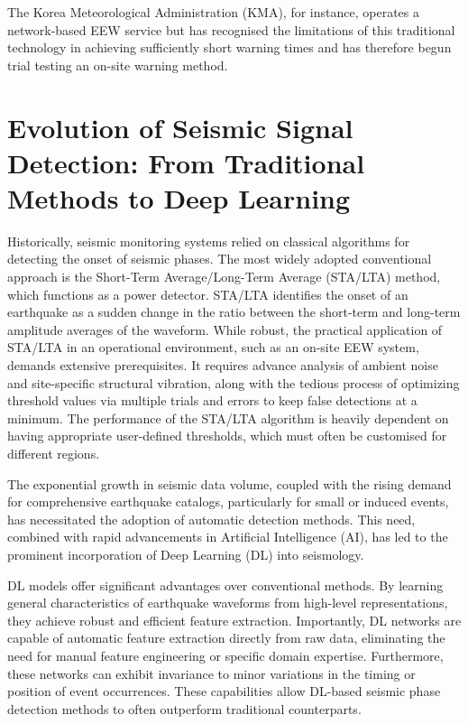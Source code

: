\documentclass[a4paper,12pt]{report}
\begin{document}
The Korea Meteorological Administration (KMA), for instance, operates a network-based EEW service but has recognised the limitations of this traditional technology in achieving sufficiently short warning times and has therefore begun trial testing an on-site warning method.

\section{Evolution of Seismic Signal Detection: From Traditional Methods to Deep Learning}
\label{sec:1.2}

Historically, seismic monitoring systems relied on classical algorithms for detecting the onset of seismic phases. The most widely adopted conventional approach is the Short-Term Average/Long-Term Average (STA/LTA) method, which functions as a power detector. STA/LTA identifies the onset of an earthquake as a sudden change in the ratio between the short-term and long-term amplitude averages of the waveform. While robust, the practical application of STA/LTA in an operational environment, such as an on-site EEW system, demands extensive prerequisites. It requires advance analysis of ambient noise and site-specific structural vibration, along with the tedious process of optimizing threshold values via multiple trials and errors to keep false detections at a minimum. The performance of the STA/LTA algorithm is heavily dependent on having appropriate user-defined thresholds, which must often be customised for different regions.

The exponential growth in seismic data volume, coupled with the rising demand for comprehensive earthquake catalogs, particularly for small or induced events, has necessitated the adoption of automatic detection methods. This need, combined with rapid advancements in Artificial Intelligence (AI), has led to the prominent incorporation of Deep Learning (DL) into seismology.

DL models offer significant advantages over conventional methods. By learning general characteristics of earthquake waveforms from high-level representations, they achieve robust and efficient feature extraction. Importantly, DL networks are capable of automatic feature extraction directly from raw data, eliminating the need for manual feature engineering or specific domain expertise. Furthermore, these networks can exhibit invariance to minor variations in the timing or position of event occurrences. These capabilities allow DL-based seismic phase detection methods to often outperform traditional counterparts.
\end{document}

